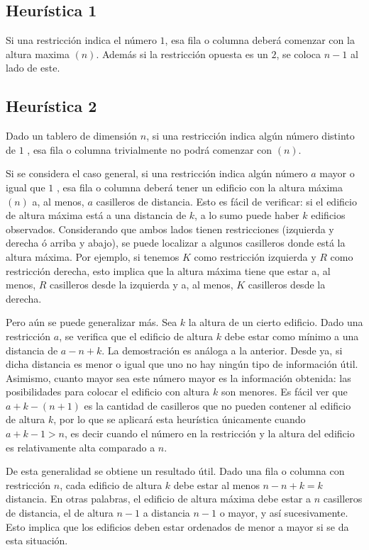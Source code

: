 \documentclass[%
	final,
	reprint,
	notitlepage,
	narroweqnarray,
	inline,
	twoside,
	invited
	]{ieee}
\begin{document}
\subsection{Heurística 1}

\par Si una restricción indica el número $1$, esa fila o columna deberá comenzar con la altura maxima $(n)$. Además si la restricción opuesta es un $2$, se coloca $n-1$ al lado de este.

\subsection{Heurística 2}

\par Dado un tablero de dimensión $n$, si una restricción indica algún número distinto de $1$ , esa fila o columna trivialmente no podrá comenzar con $(n)$.
\par Si se considera el caso general, si una restricción indica algún número $a$ mayor o igual que $1$ , esa fila o columna deberá tener un edificio con la altura máxima $(n)$ a, al menos, $a$ casilleros de distancia. Esto es fácil de verificar: si 
el edificio de altura máxima está a una distancia de $k$, a lo sumo puede haber $k$ edificios observados. Considerando que ambos lados tienen restricciones (izquierda y derecha ó arriba y abajo), se puede localizar a algunos casilleros donde está la altura máxima. Por ejemplo, si tenemos $K$ como restricción izquierda y $R$ como restricción derecha, esto implica que la altura máxima tiene que estar a, al menos, $R$ casilleros desde la izquierda y a, al menos, $K$ casilleros desde la derecha.
\par Pero aún se puede generalizar más. Sea $k$ la altura de un cierto edificio. Dado una restricción $a$, se verifica que el edificio de altura $k$ debe estar como mínimo a una distancia de $a - n + k$. La demostración es análoga a la anterior. Desde ya, si dicha distancia es menor o igual que uno no hay ningún 
tipo de información útil. Asimismo, cuanto mayor sea este número mayor es la información obtenida: las posibilidades para colocar el edificio con altura $k$ son menores. 
Es fácil ver que $ a + k - (n + 1) $ es la cantidad de casilleros que no pueden contener al edificio de altura $k$, por lo que se aplicará esta heurística únicamente cuando $ a + k - 1 > n$, es decir cuando el número en la restricción y 
la altura del edificio es relativamente alta comparado a $n$. 
\par De esta generalidad se obtiene un resultado útil. Dado una fila o columna con restricción $n$, cada edificio de altura $k$ debe estar al menos $n - n + k = k$ distancia. En otras palabras, el edificio de altura máxima debe estar a $n$ casilleros de distancia, 
el de altura $n-1$ a distancia $n-1$ o mayor, y así sucesivamente. Esto implica que los edificios deben estar ordenados de menor a mayor si se da esta situación.
\end{document}

